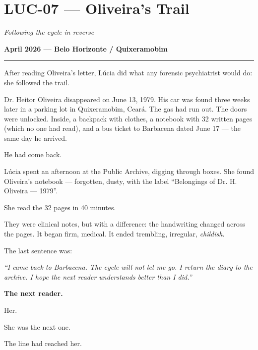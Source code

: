 \section*{\textbf{LUC-07} --- Oliveira's Trail}

\noindent \textit{Following the cycle in reverse}

\noindent \textbf{April 2026 --- Belo Horizonte / Quixeramobim}

\vspace{0.5em}\noindent\rule{\textwidth}{0.5pt}\vspace{0.5em}

\noindent After reading Oliveira's letter, Lúcia did what any forensic psychiatrist would do: she followed the trail.

\noindent Dr. Heitor Oliveira disappeared on June 13, 1979. His car was found three weeks later in a parking lot in Quixeramobim, Ceará. The gas had run out. The doors were unlocked. Inside, a backpack with clothes, a notebook with 32 written pages (which no one had read), and a bus ticket to Barbacena dated June 17 --- the same day he arrived.

\noindent He had come back.

\noindent Lúcia spent an afternoon at the Public Archive, digging through boxes. She found Oliveira's notebook --- forgotten, dusty, with the label \textquotedblleft{}Belongings of Dr. H. Oliveira --- 1979\textquotedblright{}.

\noindent She read the 32 pages in 40 minutes.

\noindent They were clinical notes, but with a difference: the handwriting changed across the pages. It began firm, medical. It ended trembling, irregular, \textit{childish}.

\noindent The last sentence was:

\noindent \textit{\textquotedblleft{}I came back to Barbacena. The cycle will not let me go. I return the diary to the archive. I hope the next reader understands better than I did.\textquotedblright{}}

\noindent \textbf{The next reader.}

\noindent Her.

\noindent She was the next one.

\noindent The line had reached her.

